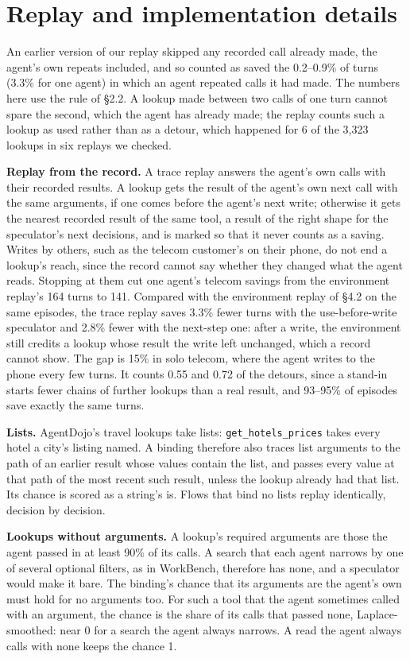 \documentclass[10pt,twocolumn,letterpaper]{article}
\newcommand{\runin}[1]{{\sffamily\bfseries\color{accent}#1}}
\begin{document}
\section{Replay and implementation details}\label{replay-and-implementation-details}

An earlier version of our replay skipped any recorded call already made, the agent's own repeats included, and so counted as saved the 0.2--0.9\% of turns (3.3\% for one agent) in which an agent repeated calls it had made. The numbers here use the rule of §2.2. A lookup made between two calls of one turn cannot spare the second, which the agent has already made; the replay counts such a lookup as used rather than as a detour, which happened for 6 of the 3,323 lookups in six replays we checked.

\runin{Replay from the record.} A trace replay answers the agent's own calls with their recorded results. A lookup gets the result of the agent's own next call with the same arguments, if one comes before the agent's next write; otherwise it gets the nearest recorded result of the same tool, a result of the right shape for the speculator's next decisions, and is marked so that it never counts as a saving. Writes by others, such as the telecom customer's on their phone, do not end a lookup's reach, since the record cannot say whether they changed what the agent reads. Stopping at them cut one agent's telecom savings from the environment replay's 164 turns to 141. Compared with the environment replay of §4.2 on the same episodes, the trace replay saves 3.3\% fewer turns with the use-before-write speculator and 2.8\% fewer with the next-step one: after a write, the environment still credits a lookup whose result the write left unchanged, which a record cannot show. The gap is 15\% in solo telecom, where the agent writes to the phone every few turns. It counts 0.55 and 0.72 of the detours, since a stand-in starts fewer chains of further lookups than a real result, and 93--95\% of episodes save exactly the same turns.

\runin{Lists.} AgentDojo's travel lookups take lists: \texttt{get\_hotels\_prices} takes every hotel a city's listing named. A binding therefore also traces list arguments to the path of an earlier result whose values contain the list, and passes every value at that path of the most recent such result, unless the lookup already had that list. Its chance is scored as a string's is. Flows that bind no lists replay identically, decision by decision.

\runin{Lookups without arguments.} A lookup's required arguments are those the agent passed in at least 90\% of its calls. A search that each agent narrows by one of several optional filters, as in WorkBench, therefore has none, and a speculator would make it bare. The binding's chance that its arguments are the agent's own must hold for no arguments too. For such a tool that the agent sometimes called with an argument, the chance is the share of its calls that passed none, Laplace-smoothed: near 0 for a search the agent always narrows. A read the agent always calls with none keeps the chance 1.
\end{document}
